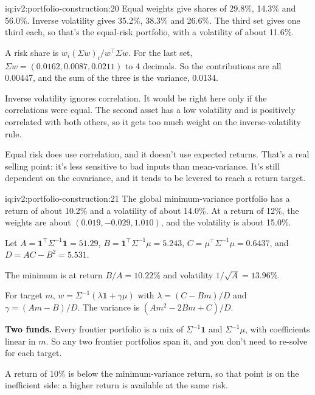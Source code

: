 \begin{solution}{iq:iv2:portfolio-construction:20}
Equal weights give shares of 29.8\%, 14.3\% and 56.0\%. Inverse volatility gives 35.2\%, 38.3\% and 26.6\%. The third set gives one third each, so that's the equal-risk portfolio, with a volatility of about 11.6\%.

A risk share is $w_i(\Sigma w)_i/w^\top\Sigma w$. For the last set, $\Sigma w = (0.0162, 0.0087, 0.0211)$ to 4 decimals. So the contributions are all 0.00447, and the sum of the three is the variance, 0.0134.

Inverse volatility ignores correlation. It would be right here only if the correlations were equal. The second asset has a low volatility and is positively correlated with both others, so it gets too much weight on the inverse-volatility rule.

Equal risk does use correlation, and it doesn't use expected returns. That's a real selling point: it's less sensitive to bad inputs than mean-variance. It's still dependent on the covariance, and it tends to be levered to reach a return target.

\end{solution}

\begin{solution}{iq:iv2:portfolio-construction:21}
The global minimum-variance portfolio has a return of about 10.2\% and a volatility of about 14.0\%. At a return of 12\%, the weights are about $(0.019, -0.029, 1.010)$, and the volatility is about 15.0\%.

Let $A = \mathbf{1}^\top\Sigma^{-1}\mathbf{1} = 51.29$, $B = \mathbf{1}^\top\Sigma^{-1}\mu = 5.243$, $C = \mu^\top\Sigma^{-1}\mu = 0.6437$, and $D = AC - B^2 = 5.531$.

The minimum is at return $B/A = 10.22\%$ and volatility $1/\sqrt{A} = 13.96\%$.

For target $m$, $w = \Sigma^{-1}(\lambda\mathbf{1} + \gamma\mu)$ with $\lambda = (C - Bm)/D$ and $\gamma = (Am - B)/D$. The variance is $(Am^2 - 2Bm + C)/D$.

\textbf{Two funds.} Every frontier portfolio is a mix of $\Sigma^{-1}\mathbf{1}$ and $\Sigma^{-1}\mu$, with coefficients linear in $m$. So any two frontier portfolios span it, and you don't need to re-solve for each target.

A return of 10\% is below the minimum-variance return, so that point is on the inefficient side: a higher return is available at the same risk.

\end{solution}

